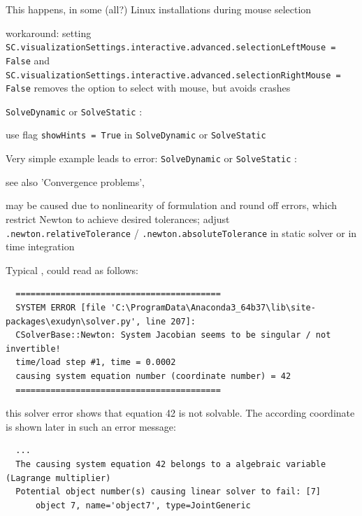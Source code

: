 \bi
\item[$\ra$] This happens, in some (all?) Linux installations during mouse selection
\item[$\ra$] workaround: setting \texttt{SC.visualizationSettings.interactive.advanced.selectionLeftMouse = False} and \texttt{SC.visualizationSettings.interactive.advanced.selectionRightMouse = False} removes the option to select with mouse, but avoids crashes
\ei
\item \texttt{SolveDynamic} or \texttt{SolveStatic} :
\bi
\item[$\ra$] use flag \texttt{showHints = True} in \texttt{SolveDynamic} or \texttt{SolveStatic}
\ei
\item Very simple example  leads to error: \texttt{SolveDynamic} or \texttt{SolveStatic} :
\bi
\item[$\ra$] see also 'Convergence problems', 
\item[$\ra$] may be caused due to nonlinearity of formulation and round off errors, which restrict Newton to achieve desired tolerances; adjust  \texttt{.newton.relativeTolerance} / \texttt{.newton.absoluteTolerance} in static solver or in time integration
\ei
\item Typical , could read as follows:
\begin{lstlisting}
  =========================================
  SYSTEM ERROR [file 'C:\ProgramData\Anaconda3_64b37\lib\site-packages\exudyn\solver.py', line 207]: 
  CSolverBase::Newton: System Jacobian seems to be singular / not invertible!
  time/load step #1, time = 0.0002
  causing system equation number (coordinate number) = 42
  =========================================
\end{lstlisting}
\onlyRST{\rstStartNewLine}
%
\bi
\item[$\ra$] this solver error shows that equation 42 is not solvable. The according coordinate is shown later in such an error message:
\ei
\begin{lstlisting}
  ...
  The causing system equation 42 belongs to a algebraic variable (Lagrange multiplier)
  Potential object number(s) causing linear solver to fail: [7]
      object 7, name='object7', type=JointGeneric
\end{lstlisting}
